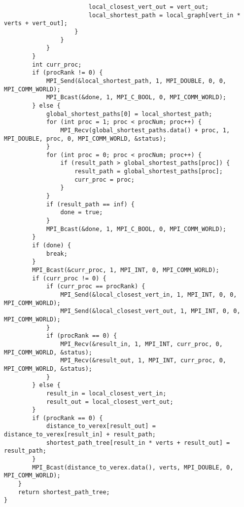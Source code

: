 \documentclass{report}
\begin{document}
\begin{lstlisting}
                        local_closest_vert_out = vert_out;
                        local_shortest_path = local_graph[vert_in * verts + vert_out];
                    }
                }
            }
        }
        int curr_proc;
        if (procRank != 0) {
            MPI_Send(&local_shortest_path, 1, MPI_DOUBLE, 0, 0, MPI_COMM_WORLD);
            MPI_Bcast(&done, 1, MPI_C_BOOL, 0, MPI_COMM_WORLD);
        } else {
            global_shortest_paths[0] = local_shortest_path;
            for (int proc = 1; proc < procNum; proc++) {
                MPI_Recv(global_shortest_paths.data() + proc, 1, MPI_DOUBLE, proc, 0, MPI_COMM_WORLD, &status);
            }
            for (int proc = 0; proc < procNum; proc++) {
                if (result_path > global_shortest_paths[proc]) {
                    result_path = global_shortest_paths[proc];
                    curr_proc = proc;
                }
            }
            if (result_path == inf) {
                done = true;
            }
            MPI_Bcast(&done, 1, MPI_C_BOOL, 0, MPI_COMM_WORLD);
        }
        if (done) {
            break;
        }
        MPI_Bcast(&curr_proc, 1, MPI_INT, 0, MPI_COMM_WORLD);
        if (curr_proc != 0) {
            if (curr_proc == procRank) {
                MPI_Send(&local_closest_vert_in, 1, MPI_INT, 0, 0, MPI_COMM_WORLD);
                MPI_Send(&local_closest_vert_out, 1, MPI_INT, 0, 0, MPI_COMM_WORLD);
            }
            if (procRank == 0) {
                MPI_Recv(&result_in, 1, MPI_INT, curr_proc, 0, MPI_COMM_WORLD, &status);
                MPI_Recv(&result_out, 1, MPI_INT, curr_proc, 0, MPI_COMM_WORLD, &status);
            }
        } else {
            result_in = local_closest_vert_in;
            result_out = local_closest_vert_out;
        }
        if (procRank == 0) {
            distance_to_verex[result_out] = distance_to_verex[result_in] + result_path;
            shortest_path_tree[result_in * verts + result_out] = result_path;
        }
        MPI_Bcast(distance_to_verex.data(), verts, MPI_DOUBLE, 0, MPI_COMM_WORLD);
    }
    return shortest_path_tree;
}
\end{lstlisting}
\end{document}
